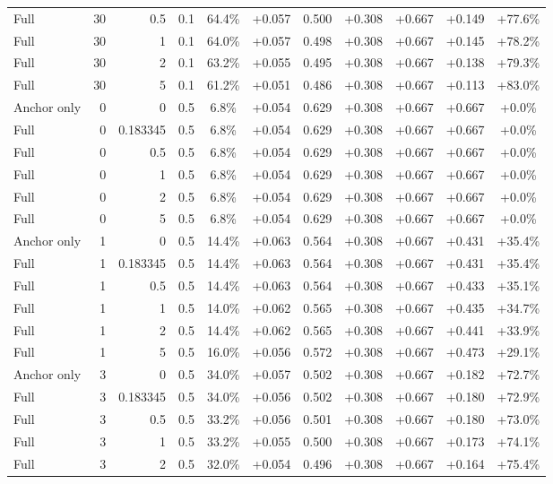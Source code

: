 \begin{table}[htbp]
\begin{tabular}{lrrrccccccc}
Full & 30 & 0.5 & 0.1 & 64.4\% & +0.057 & 0.500 & +0.308 & +0.667 & +0.149 & +77.6\% \\
Full & 30 & 1 & 0.1 & 64.0\% & +0.057 & 0.498 & +0.308 & +0.667 & +0.145 & +78.2\% \\
Full & 30 & 2 & 0.1 & 63.2\% & +0.055 & 0.495 & +0.308 & +0.667 & +0.138 & +79.3\% \\
Full & 30 & 5 & 0.1 & 61.2\% & +0.051 & 0.486 & +0.308 & +0.667 & +0.113 & +83.0\% \\
Anchor only & 0 & 0 & 0.5 & 6.8\% & +0.054 & 0.629 & +0.308 & +0.667 & +0.667 & +0.0\% \\
Full & 0 & 0.183345 & 0.5 & 6.8\% & +0.054 & 0.629 & +0.308 & +0.667 & +0.667 & +0.0\% \\
Full & 0 & 0.5 & 0.5 & 6.8\% & +0.054 & 0.629 & +0.308 & +0.667 & +0.667 & +0.0\% \\
Full & 0 & 1 & 0.5 & 6.8\% & +0.054 & 0.629 & +0.308 & +0.667 & +0.667 & +0.0\% \\
Full & 0 & 2 & 0.5 & 6.8\% & +0.054 & 0.629 & +0.308 & +0.667 & +0.667 & +0.0\% \\
Full & 0 & 5 & 0.5 & 6.8\% & +0.054 & 0.629 & +0.308 & +0.667 & +0.667 & +0.0\% \\
Anchor only & 1 & 0 & 0.5 & 14.4\% & +0.063 & 0.564 & +0.308 & +0.667 & +0.431 & +35.4\% \\
Full & 1 & 0.183345 & 0.5 & 14.4\% & +0.063 & 0.564 & +0.308 & +0.667 & +0.431 & +35.4\% \\
Full & 1 & 0.5 & 0.5 & 14.4\% & +0.063 & 0.564 & +0.308 & +0.667 & +0.433 & +35.1\% \\
Full & 1 & 1 & 0.5 & 14.0\% & +0.062 & 0.565 & +0.308 & +0.667 & +0.435 & +34.7\% \\
Full & 1 & 2 & 0.5 & 14.4\% & +0.062 & 0.565 & +0.308 & +0.667 & +0.441 & +33.9\% \\
Full & 1 & 5 & 0.5 & 16.0\% & +0.056 & 0.572 & +0.308 & +0.667 & +0.473 & +29.1\% \\
Anchor only & 3 & 0 & 0.5 & 34.0\% & +0.057 & 0.502 & +0.308 & +0.667 & +0.182 & +72.7\% \\
Full & 3 & 0.183345 & 0.5 & 34.0\% & +0.056 & 0.502 & +0.308 & +0.667 & +0.180 & +72.9\% \\
Full & 3 & 0.5 & 0.5 & 33.2\% & +0.056 & 0.501 & +0.308 & +0.667 & +0.180 & +73.0\% \\
Full & 3 & 1 & 0.5 & 33.2\% & +0.055 & 0.500 & +0.308 & +0.667 & +0.173 & +74.1\% \\
Full & 3 & 2 & 0.5 & 32.0\% & +0.054 & 0.496 & +0.308 & +0.667 & +0.164 & +75.4\% \\

\end{tabular}
\end{table}
